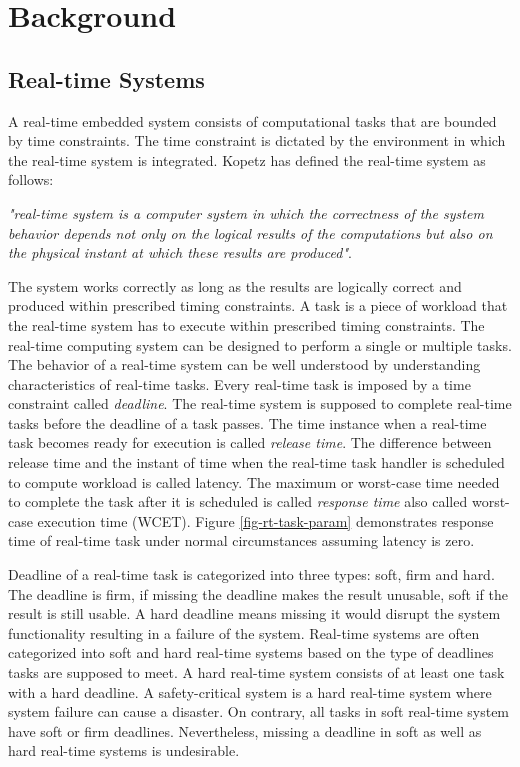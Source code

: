 \chapter{Background\label{chap2}}

\section{Real-time Systems}
A real-time embedded system consists of computational tasks that are bounded by time constraints. The time constraint is dictated by the environment in which the real-time system is integrated. 
Kopetz \cite{Kopetz:2011:RSD:1995310} has defined the real-time system as follows:

\emph{"real-time system is a computer system in which the correctness of the system behavior depends not only on the logical results of the computations but also on the physical instant at which these results are produced"}. 

The system works correctly as long as the results are logically correct and produced within prescribed timing constraints. 
A task is a piece of workload that the real-time system has to execute within prescribed timing constraints. 
The real-time computing system can be designed to perform a single or multiple tasks. 
The behavior of a real-time system can be well understood by understanding characteristics of real-time tasks. 
Every real-time task is imposed by a time constraint called \emph{deadline}. 
The real-time system is supposed to complete real-time tasks before the deadline of a task passes.
The time instance when a real-time task becomes ready for execution is called \emph{release time}. 
The difference between release time and the instant of time when the real-time task handler is scheduled to compute workload is called latency.
The maximum or worst-case time needed to complete the task after it is scheduled is called \emph{response time} also called worst-case execution time (WCET). 
Figure \ref{fig-rt-task-param} demonstrates response time of real-time task under normal circumstances assuming latency is zero. 



Deadline of a real-time task is categorized into three types: soft, firm and hard. 
The deadline is firm, if missing the deadline makes the result unusable, soft if the result is still usable. 
A hard deadline means missing it would disrupt the system functionality resulting in a failure of the system.
Real-time systems are often categorized into soft and hard real-time systems based on the type of deadlines tasks are supposed to meet.
A hard real-time system consists of at least one task with a hard deadline. 
A safety-critical system is a hard real-time system where system failure can cause a disaster.
On contrary, all tasks in soft real-time system have soft or firm deadlines. 
Nevertheless, missing a deadline in soft as well as hard real-time systems is undesirable.

